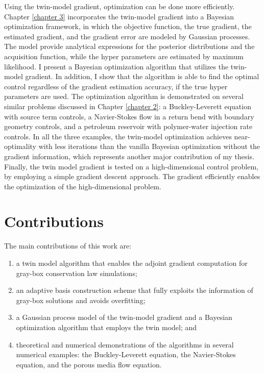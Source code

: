 Using the twin-model gradient, optimization can be done more efficiently.
Chapter \ref{chapter 3} incorporates the twin-model gradient into a Bayesian optimization framework,
in which the objective function, the true gradient,
the estimated gradient, and the gradient error are modeled by Gaussian processes.
The model provide analytical expressions for the 
posterior distributions and the acquisition function, while the 
hyper parameters are estimated by maximum likelihood.
I present a Bayesian optimization algorithm that utilizes the twin-model gradient.
In addition, I show that the algorithm is able to find the optimal control regardless
of the gradient estimation accuracy, if the true hyper parameters are used.
The optimization algorithm is demonstrated on several similar problems discussed in
Chapter \ref{chapter 2}:
a Buckley-Leverett equation with source term controls,
a Navier-Stokes flow in a return bend with boundary geometry controls,
and a petroleum reservoir with polymer-water injection rate controls.
In all the three examples, the
twin-model optimization achieves
near-optimality with less iterations than the vanilla Bayesian optimization without
the gradient information,
which represents another major contribution of my thesis.
Finally, the twin model gradient is tested on a
high-dimensional control problem, by employing a simple gradient descent approach. 
The gradient efficiently enables the optimization of the high-dimensional problem.\\


\section{Contributions}
The main contributions of this work are:
\begin{enumerate}
    \item a twin model algorithm that enables the adjoint gradient computation for gray-box
          conservation law simulations;
    \item an adaptive basis construction scheme that fully exploits the information of
          gray-box solutions and avoids overfitting;
    \item a Gaussian process model of the twin-model gradient
          and a Bayesian optimization algorithm that employs the twin model; and
    \item theoretical and numerical demonstrations of the algorithms 
          in several numerical examples: the Buckley-Leverett equation, the
          Navier-Stokes equation, and the porous media flow equation.
\end{enumerate}


